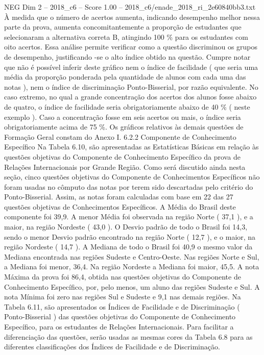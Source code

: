 \begin{textsample}{NEG Dim 2 – 2018\_c6 – Score 1.00 – 2018\_c6/enade\_2018\_ri\_2e60840bb3.txt}
À medida que o número de acertos aumenta, indicando desempenho melhor nessa parte da prova, aumenta concomitantemente a proporção de estudantes que selecionaram a alternativa correta B, atingindo 100 \% para os estudantes com oito acertos.
Essa análise permite verificar como a questão discriminou os grupos de desempenho, justificando -se o alto índice obtido na questão.
Cumpre notar que não é possível inferir deste gráfico nem o índice de facilidade ( que seria uma média da proporção ponderada pela quantidade de alunos com cada uma das notas ), nem o índice de discriminação Ponto-Bisserial, por razão equivalente.
No caso extremo, no qual a grande concentração dos acertos dos alunos fosse abaixo de quatro, o índice de facilidade seria obrigatoriamente abaixo de 40 \% ( neste exemplo ).
Caso a concentração fosse em seis acertos ou mais, o índice seria obrigatoriamente acima de 75 \%.
Os gráficos relativos às demais questões de Formação Geral constam do Anexo I. 6.2.2 Componente de Conhecimento Específico Na Tabela 6.10, são apresentadas as Estatísticas Básicas em relação às questões objetivas do Componente de Conhecimento Específico da prova de Relações Internacionais por Grande Região.
Como será discutido ainda nesta seção, cinco questões objetivas do Componente de Conhecimentos Específicos não foram usadas no cômputo das notas por terem sido descartadas pelo critério do Ponto-Bisserial.
Assim, as notas foram calculadas com base em 22 das 27 questões objetivas de Conhecimentos Específicos.
A Média do Brasil deste componente foi 39,9.
A menor Média foi observada na região Norte ( 37,1 ), e a maior, na região Nordeste ( 43,0 ).
O Desvio padrão de todo o Brasil foi 14,3, sendo o menor Desvio padrão encontrado na região Norte ( 12,7 ), e o maior, na região Nordeste ( 14,7 ).
A Mediana de todo o Brasil foi 40,9 o mesmo valor da Mediana encontrada nas regiões Sudeste e Centro-Oeste.
Nas regiões Norte e Sul, a Mediana foi menor, 36,4.
Na região Nordeste a Mediana foi maior, 45,5.
A nota Máxima da prova foi 86,4, obtida nas questões objetivas do Componente de Conhecimento Específico, por, pelo menos, um aluno das regiões Sudeste e Sul.
A nota Mínima foi zero nas regiões Sul e Sudeste e 9,1 nas demais regiões.
Na Tabela 6.11, são apresentados os Índices de Facilidade e de Discriminação ( Ponto-Bisserial ) das questões objetivas do Componente de Conhecimento Específico, para os estudantes de Relações Internacionais.
Para facilitar a diferenciação das questões, serão usadas as mesmas cores da Tabela 6.8 para as diferentes classificações dos Índices de Facilidade e de Discriminação.

\end{textsample}

